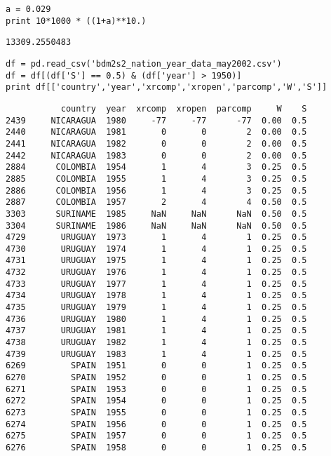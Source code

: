 \documentclass[12pt,fleqn]{article}\usepackage{common}
\begin{document}
\begin{verbatim}
a = 0.029
print 10*1000 * ((1+a)**10.)
\end{verbatim}

\begin{verbatim}
13309.2550483
\end{verbatim}

\begin{verbatim}
df = pd.read_csv('bdm2s2_nation_year_data_may2002.csv')
df = df[(df['S'] == 0.5) & (df['year'] > 1950)]
print df[['country','year','xrcomp','xropen','parcomp','W','S']]
\end{verbatim}

\begin{verbatim}
           country  year  xrcomp  xropen  parcomp     W    S
2439     NICARAGUA  1980     -77     -77      -77  0.00  0.5
2440     NICARAGUA  1981       0       0        2  0.00  0.5
2441     NICARAGUA  1982       0       0        2  0.00  0.5
2442     NICARAGUA  1983       0       0        2  0.00  0.5
2884      COLOMBIA  1954       1       4        3  0.25  0.5
2885      COLOMBIA  1955       1       4        3  0.25  0.5
2886      COLOMBIA  1956       1       4        3  0.25  0.5
2887      COLOMBIA  1957       2       4        4  0.50  0.5
3303      SURINAME  1985     NaN     NaN      NaN  0.50  0.5
3304      SURINAME  1986     NaN     NaN      NaN  0.50  0.5
4729       URUGUAY  1973       1       4        1  0.25  0.5
4730       URUGUAY  1974       1       4        1  0.25  0.5
4731       URUGUAY  1975       1       4        1  0.25  0.5
4732       URUGUAY  1976       1       4        1  0.25  0.5
4733       URUGUAY  1977       1       4        1  0.25  0.5
4734       URUGUAY  1978       1       4        1  0.25  0.5
4735       URUGUAY  1979       1       4        1  0.25  0.5
4736       URUGUAY  1980       1       4        1  0.25  0.5
4737       URUGUAY  1981       1       4        1  0.25  0.5
4738       URUGUAY  1982       1       4        1  0.25  0.5
4739       URUGUAY  1983       1       4        1  0.25  0.5
6269         SPAIN  1951       0       0        1  0.25  0.5
6270         SPAIN  1952       0       0        1  0.25  0.5
6271         SPAIN  1953       0       0        1  0.25  0.5
6272         SPAIN  1954       0       0        1  0.25  0.5
6273         SPAIN  1955       0       0        1  0.25  0.5
6274         SPAIN  1956       0       0        1  0.25  0.5
6275         SPAIN  1957       0       0        1  0.25  0.5
6276         SPAIN  1958       0       0        1  0.25  0.5

\end{verbatim}
\end{document}
